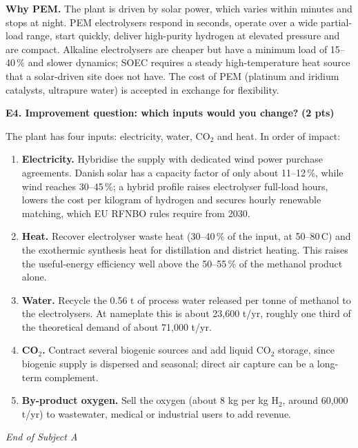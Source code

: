 \documentclass[11pt,a4paper]{article}
\newcommand{\degC}{\,\textdegree C}
\newcommand{\pts}[1]{\hfill{\normalsize\textbf{(#1)}}}
\begin{document}
\medskip
\textbf{Why PEM.} The plant is driven by solar power, which varies within minutes and stops at night. PEM electrolysers
respond in seconds, operate over a wide partial-load range, start quickly, deliver high-purity hydrogen at elevated
pressure and are compact. Alkaline electrolysers are cheaper but have a minimum load of 15--40\,\% and slower dynamics;
SOEC requires a steady high-temperature heat source that a solar-driven site does not have. The cost of PEM (platinum
and iridium catalysts, ultrapure water) is accepted in exchange for flexibility.

\textbf{E4. Improvement question: which inputs would you change?} \pts{2 pts}

The plant has four inputs: electricity, water, CO$_2$ and heat. In order of impact:
\begin{enumerate}
  \item \textbf{Electricity.} Hybridise the supply with dedicated wind power purchase agreements. Danish solar has a
        capacity factor of only about 11--12\,\%, while wind reaches 30--45\,\%; a hybrid profile raises electrolyser
        full-load hours, lowers the cost per kilogram of hydrogen and secures hourly renewable matching, which EU
        RFNBO rules require from 2030.
  \item \textbf{Heat.} Recover electrolyser waste heat (30--40\,\% of the input, at 50--80\degC) and the exothermic
        synthesis heat for distillation and district heating. This raises the useful-energy efficiency well above the
        50--55\,\% of the methanol product alone.
  \item \textbf{Water.} Recycle the 0.56 t of process water released per tonne of methanol to the electrolysers.
        At nameplate this is about 23,600 t/yr, roughly one third of the theoretical demand of about 71,000 t/yr.
  \item \textbf{CO$_2$.} Contract several biogenic sources and add liquid CO$_2$ storage, since biogenic supply is
        dispersed and seasonal; direct air capture can be a long-term complement.
  \item \textbf{By-product oxygen.} Sell the oxygen (about 8 kg per kg H$_2$, around 60,000 t/yr) to wastewater,
        medical or industrial users to add revenue.
\end{enumerate}

\begin{center}\textit{End of Subject A}\end{center}
\end{document}
